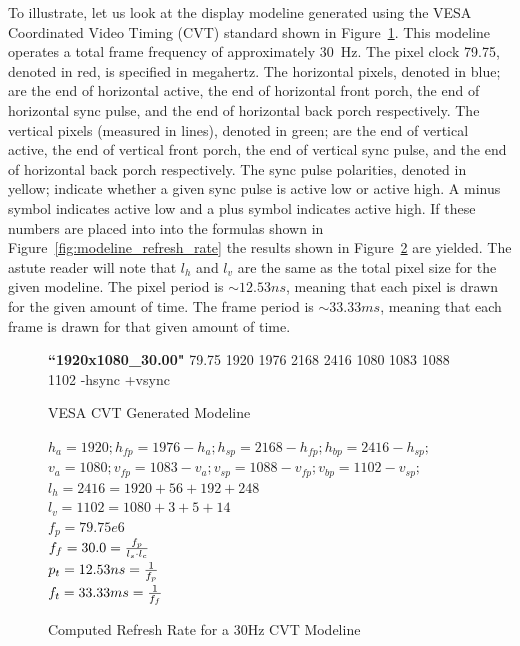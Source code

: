     To illustrate, let us look at the display modeline generated using the VESA Coordinated Video Timing (CVT) standard shown in Figure~\ref{fig:modeline_example}. This modeline operates a total frame frequency of approximately \mbox{30 Hz}. The pixel clock 79.75, denoted in red, is specified in megahertz. The horizontal pixels, denoted in blue; are the end of horizontal active, the end of horizontal front porch, the end of horizontal sync pulse, and the end of horizontal back porch respectively. The vertical pixels (measured in lines), denoted in green; are the end of vertical active, the end of vertical front porch, the end of vertical sync pulse, and the end of horizontal back porch respectively. The sync pulse polarities, denoted in yellow; indicate whether a given sync pulse is active low or active high. A minus symbol indicates active low and a plus symbol indicates active high. If these numbers are placed into into the formulas shown in Figure~\ref{fig:modeline_refresh_rate} the results shown in Figure~\ref{fig:modeline_refresh_rate_plug} are yielded. The astute reader will note that $l_h$ and $l_v$ are the same as the total pixel size for the given modeline. The pixel period is $\sim12.53 ns$, meaning that each pixel is drawn for the given amount of time. The frame period is $\sim33.33 ms$, meaning that each frame is drawn for that given amount of time.

    \begin{figure}
        \centering
        { \normalsize
        \textbf{``1920x1080\_30.00"} {\color{red}79.75}  {\color{blue} 1920 1976 2168 2416}  {\color{darkgreen}1080 1083 1088 1102} {\color{olive}-hsync +vsync}
        }
        \caption{VESA CVT Generated Modeline}
        \label{fig:modeline_example}
    \end{figure}

    \begin{figure}
        \centering
        { \Large
            $h_a=1920; h_{fp}=1976-h_a; h_{sp}=2168-h_{fp}; h_{bp}=2416-h_{sp};$ \\
            $v_a=1080; v_{fp}=1083-v_a; v_{sp}=1088-v_{fp}; v_{bp}=1102-v_{sp};$ \\
            $l_h=2416=1920+56+192+248$ \vspace{8px} \\
            $l_v=1102=1080+3+5+14$ \vspace{8px} \\
            $f_p=79.75e6$ \vspace{8px} \\
            $f_f=30.0={f_p \over {l_s \cdot l_c}}$ \\
            $p_t=12.53ns={1 \over f_p}$ \vspace{8px} \\
            $f_t=33.33ms={1 \over f_f}$ \vspace{8px}
        }
        \caption{Computed Refresh Rate for a 30Hz CVT Modeline}
        \label{fig:modeline_refresh_rate_plug}
    \end{figure}

